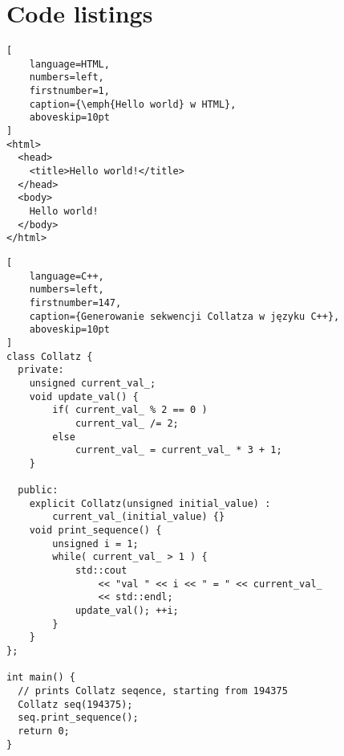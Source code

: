 \clearpage %
\section{Code listings}

\lipsum[10]

\begin{addmargin}[8mm]{0mm}
\begin{lstlisting}[
    language=HTML,
    numbers=left,
    firstnumber=1,
    caption={\emph{Hello world} w HTML},
    aboveskip=10pt
]
<html>
  <head>
    <title>Hello world!</title>
  </head>
  <body>
    Hello world!
  </body>
</html>
\end{lstlisting}
\end{addmargin}

\lipsum[11]

\begin{addmargin}[12mm]{0mm}
\begin{lstlisting}[
    language=C++,
    numbers=left,
    firstnumber=147,
    caption={Generowanie sekwencji Collatza w języku C++},
    aboveskip=10pt
]
class Collatz {
  private:
    unsigned current_val_;
    void update_val() {
        if( current_val_ % 2 == 0 )
            current_val_ /= 2;
        else
            current_val_ = current_val_ * 3 + 1;
    }

  public:
    explicit Collatz(unsigned initial_value) :
        current_val_(initial_value) {}
    void print_sequence() {
        unsigned i = 1;
        while( current_val_ > 1 ) {
            std::cout
                << "val " << i << " = " << current_val_
                << std::endl;
            update_val(); ++i;
        }
    }
};

int main() {
  // prints Collatz seqence, starting from 194375
  Collatz seq(194375);
  seq.print_sequence();
  return 0;
}
\end{lstlisting}
\end{addmargin}

\lipsum[12]
